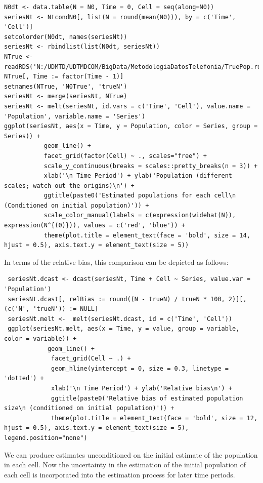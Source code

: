 \documentclass[12pt, a4paper]{article}
\begin{document}
\begin{verbatim}
N0dt <- data.table(N = N0, Time = 0, Cell = seq(along=N0))
seriesNt <- NtcondN0[, list(N = round(mean(N0))), by = c('Time', 'Cell')]
setcolorder(N0dt, names(seriesNt))
seriesNt <- rbindlist(list(N0dt, seriesNt))
NTrue <- readRDS('N:/UDMTD/UDTMDCOM/BigData/MetodologiaDatosTelefonia/TruePop.rds')
NTrue[, Time := factor(Time - 1)]
setnames(NTrue, 'N0True', 'trueN')
seriesNt <- merge(seriesNt, NTrue)
seriesNt <- melt(seriesNt, id.vars = c('Time', 'Cell'), value.name = 'Population', variable.name = 'Series')
ggplot(seriesNt, aes(x = Time, y = Population, color = Series, group = Series)) + 
           geom_line() + 
           facet_grid(factor(Cell) ~ ., scales="free") +
           scale_y_continuous(breaks = scales::pretty_breaks(n = 3)) +
           xlab('\n Time Period') + ylab('Population (different scales; watch out the origins)\n') +
           ggtitle(paste0('Estimated populations for each cell\n (Conditioned on initial population)')) +
           scale_color_manual(labels = c(expression(widehat(N)), expression(N^{(0)})), values = c('red', 'blue')) +
           theme(plot.title = element_text(face = 'bold', size = 14, hjust = 0.5), axis.text.y = element_text(size = 5))
\end{verbatim}
 
 
 In terms of the relative bias, this comparison can be depicted as follows:
 
 \begin{verbatim}
 seriesNt.dcast <- dcast(seriesNt, Time + Cell ~ Series, value.var = 'Population')
 seriesNt.dcast[, relBias := round((N - trueN) / trueN * 100, 2)][, (c('N', 'trueN')) := NULL]
 seriesNt.melt <-  melt(seriesNt.dcast, id = c('Time', 'Cell'))
 ggplot(seriesNt.melt, aes(x = Time, y = value, group = variable, color = variable)) + 
            geom_line() + 
             facet_grid(Cell ~ .) +
             geom_hline(yintercept = 0, size = 0.3, linetype = 'dotted') + 
             xlab('\n Time Period') + ylab('Relative bias\n') +
             ggtitle(paste0('Relative bias of estimated population size\n (conditioned on initial population)')) +
             theme(plot.title = element_text(face = 'bold', size = 12, hjust = 0.5), axis.text.y = element_text(size = 5), legend.position="none")
 \end{verbatim}
 
 
 
We can produce estimates unconditioned on the initial estimate of the population in each cell. Now the uncertainty in the estimation of the initial population of each cell is incorporated into the estimation process for later time periods.
 
\end{document}
